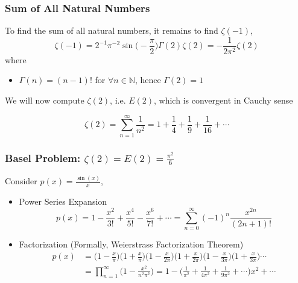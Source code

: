 \documentclass{beamer}
\begin{document}

\begin{frame}
\frametitle{Sum of All Natural Numbers}

To find the sum of all natural numbers, it remains to find $\zeta(-1)$, 
$$ \zeta(-1) = 2^{-1} \pi^{-2} \sin \big( -\frac{\pi}{2} \big) \Gamma (2) \zeta(2) = - \frac{1}{2 \pi^2} \zeta(2) $$
where 
\begin{itemize}
    \item $\Gamma(n) = (n-1)!$ for $ \forall n \in \mathbb{N} $, hence $ \Gamma(2) = 1 $
\end{itemize}

We will now compute $\zeta(2)$, i.e. $E(2)$, which is convergent in Cauchy sense 

$$ \zeta(2) = \sum_{n=1}^{\infty} \frac{1}{n^2} = 1 + \frac{1}{4} + \frac{1}{9} + \frac{1}{16} + \cdots $$

\end{frame}


\begin{frame}
\frametitle{Basel Problem: $ \zeta(2) = E(2) = \frac{\pi^2}{6} $}
Consider $ p(x) = \frac{\sin(x)}{x} $, 
\begin{itemize}
    \item Power Series Expansion
    $$ p(x) = 1 - \frac{x^2}{3!} + \frac{x^4}{5!} - \frac{x^6}{7!} + \cdots = \sum_{n=0}^{\infty} (-1)^n \frac{x^{2n}}{(2n+1)!} $$ 
    \item Factorization (Formally, Weierstrass Factorization Theorem)
    \begin{align*}
        p(x) &= \big(1 - \frac{x}{\pi}\big)\big(1 + \frac{x}{\pi}\big)\big(1 - \frac{x}{2\pi}\big)\big(1 + \frac{x}{2\pi}\big)\big(1 - \frac{x}{3\pi}\big)\big(1 + \frac{x}{3\pi}\big)\cdots \\ 
        &= \prod_{n=1}^{\infty} \big(1 - \frac{x^2}{n^2 \pi^2}\big) 
        = 1 - \big( \frac{1}{\pi^2} + \frac{1}{4\pi^2} + \frac{1}{9\pi^2} + \cdots \big) x^2 + \cdots 
    \end{align*}
\end{itemize}

\end{frame}

\end{document}
